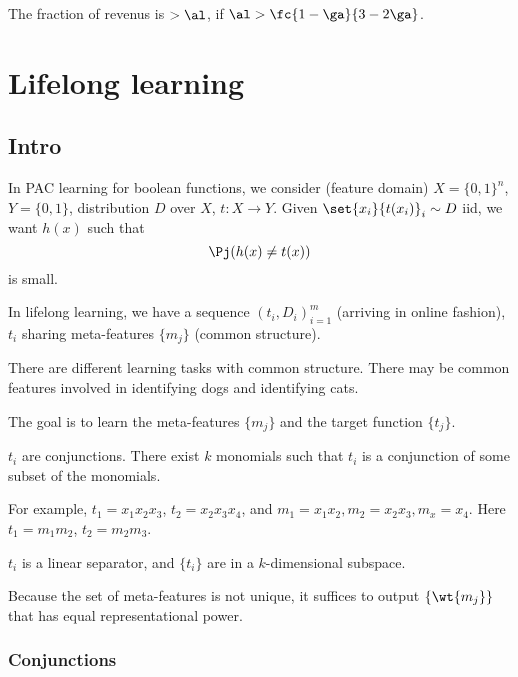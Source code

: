 The fraction of revenus is $>\al$, if $\al>\fc{1-\ga}{3-2\ga}$. 



\section{Lifelong learning}

\subsection{Intro}

In PAC learning for boolean functions, we consider (feature domain) $X=\{0,1\}^n$, $Y=\{0,1\}$, distribution $D$ over $X$, $t:X\to Y$. Given $\set{x_i}{t(x_i)}_i\sim D$ iid, we want $h(x)$ such that 
\[
\Pj(h(x)\ne t(x))
\]
is small.

In lifelong learning, we have a sequence $(t_i,D_i)_{i=1}^m$ (arriving in online fashion), $t_i$ sharing meta-features $\{m_j\}$ (common structure).

There are different learning tasks with common structure. There may be common features involved in identifying dogs and identifying cats. 

The goal is to learn the meta-features $\{m_j\}$ and the target function $\{t_j\}$.


\begin{ex}
$t_i$ are conjunctions. There exist $k$ monomials such that $t_i$ is a conjunction of some subset of the monomials.

For example, $t_1=x_1x_2x_3$, $t_2=x_2x_3x_4$, and $m_1=x_1x_2,m_2=x_2x_3,m_x=x_4$. Here $t_1=m_1m_2$, $t_2=m_2m_3$.
\end{ex}

\begin{ex}
$t_i$ is a linear separator, and $\{t_i\}$ are in a $k$-dimensional subspace. 
\end{ex}
Because the set of meta-features is not unique, it suffices to output $\{\wt{m_j}\}$ that has equal representational power.

\subsubsection{Conjunctions}

